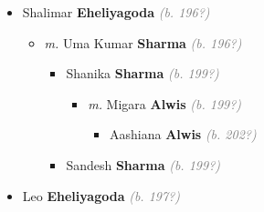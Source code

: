 \documentclass[10pt, openany]{book}
\begin{document}
\begin{itemize}
{\begin{itemize}
{\begin{itemize}
{\begin{itemize}
{\begin{itemize}
{\begin{itemize}
{\begin{itemize}
{\begin{itemize}
{\begin{itemize}
\item{\textit{m.} Lakshman \textbf{Madurasinghe} \textcolor{gray}{\textit{(b. 196?)}}   \label{couple:00001561:00001562} \begin{itemize}
\item{Rosanth Lakshan \textbf{Madurasinghe} \textcolor{gray}{\textit{(b. 199?)}}
\begin{itemize}
\item{\textit{m.} Nishani \textbf{Fernando} \textcolor{gray}{\textit{(b. 199?)}}   \label{couple:00001563:00001564} \begin{itemize}
\item{Romaan \textbf{Madurasinghe} \textcolor{gray}{\textit{(b. 202?)}}
 }
\end{itemize}}
\end{itemize}
  }
\end{itemize}}
\end{itemize}
 }
\item{Shalimar \textbf{Eheliyagoda} \textcolor{gray}{\textit{(b. 196?)}}
\begin{itemize}
\item{\textit{m.} Uma Kumar \textbf{Sharma} \textcolor{gray}{\textit{(b. 196?)}}   \label{couple:00001555:00001556} \begin{itemize}
\item{Shanika \textbf{Sharma} \textcolor{gray}{\textit{(b. 199?)}}
\begin{itemize}
\item{\textit{m.} Migara \textbf{Alwis} \textcolor{gray}{\textit{(b. 199?)}}   \label{couple:00001557:00001558} \begin{itemize}
\item{Aashiana \textbf{Alwis} \textcolor{gray}{\textit{(b. 202?)}}
 }
\end{itemize}}
\end{itemize}
 }
\item{Sandesh \textbf{Sharma} \textcolor{gray}{\textit{(b. 199?)}}
 }
\end{itemize}}
\end{itemize}
 }
\item{Leo \textbf{Eheliyagoda} \textcolor{gray}{\textit{(b. 197?)}}
\begin{itemize}

\end{itemize}}
\end{itemize}}
\end{itemize}}
\end{itemize}}
\end{itemize}}
\end{itemize}}
\end{itemize}}
\end{itemize}}
\end{itemize}
\end{document}
